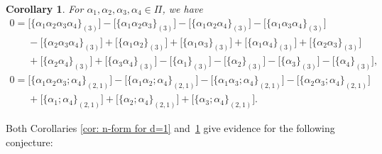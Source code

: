 \documentclass[pdftex]{sigma}
\numberwithin{equation}{section}
\newtheorem{Corollary}[Theorem]{Corollary}
\begin{document}
\begin{Corollary} \label{cor: n-form for d=2}
 For $\alpha_1,\alpha_2,\alpha_3,\alpha_4 \in \Pi$, we have
 \begin{gather*}
 0=\big[\{\alpha_1\alpha_2\alpha_3\alpha_4\}_{(3)} \big]-\big[\{\alpha_1\alpha_2\alpha_3\}_{(3)} \big]
 -\big[\{\alpha_1\alpha_2\alpha_4\}_{(3)} \big]
-\big[\{\alpha_1\alpha_3\alpha_4\}_{(3)} \big]\nonumber\\
 \phantom{0=}{}-\big[\{\alpha_2\alpha_3\alpha_4\}_{(3)} \big]
 +\big[\{\alpha_1\alpha_2\}_{(3)} \big]
+\big[\{\alpha_1\alpha_3\}_{(3)} \big]
 +\big[\{\alpha_1\alpha_4\}_{(3)} \big]
+\big[\{\alpha_2\alpha_3\}_{(3)} \big]\nonumber\\
\phantom{0=}{}+\big[\{\alpha_2\alpha_4\}_{(3)} \big]
 +\big[\{\alpha_3\alpha_4\}_{(3)} \big]
 -\big[\{\alpha_1\}_{(3)} \big]
-\big[\{\alpha_2\}_{(3)} \big]
 -\big[\{\alpha_3\}_{(3)} \big]
 -\big[\{\alpha_4\}_{(3)} \big],
 \\
 0=\big[\{\alpha_1\alpha_2\alpha_3;\alpha_4\}_{(2,1)}\big]-\big[\{\alpha_1\alpha_2;\alpha_4\}_{(2,1)}\big]-\big[\{\alpha_1\alpha_3;\alpha_4\}_{(2,1)}\big]-\big[\{\alpha_2\alpha_3;\alpha_4\}_{(2,1)}\big]\nonumber\\
 \phantom{0=}{}+\big[\{\alpha_1;\alpha_4\}_{(2,1)}\big]+\big[\{\alpha_2;\alpha_4\}_{(2,1)}\big]+\big[\{\alpha_3;\alpha_4\}_{(2,1)}\big].
 \end{gather*}
\end{Corollary}

Both Corollaries \ref{cor: n-form for d=1} and~\ref{cor: n-form for d=2} give evidence for the following conjecture:
\end{document}

